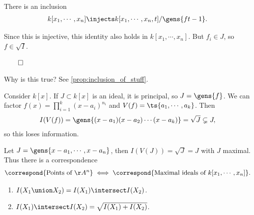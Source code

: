 \begin{proposition}[?]\label{prop:inclusion_of_stuff}

There is an inclusion
\begin{align*}  
k[x_1, \cdots, x_n] \injects
k[x_1, \cdots, x_n, t]/\gens{ft-1}
.\end{align*}

\end{proposition}

Since this is injective, this identity also holds in
\(k[x_1, \cdots, x_n]\). But \(f_i\in J\), so \(f\in \sqrt{I}\).

\(\qed\)

\begin{exercise}[?]

Why is this true? See \cref{prop:inclusion_of_stuff}.

\end{exercise}

\begin{example}

Consider \(k[x]\). If \(J\subset k[x]\) is an ideal, it is principal, so
\(J = \gens{f}\). We can factor \(f(x) = \prod_{i=1}^k (x-a_i)^{n_i}\)
and \(V(f) = \ts{a_1, \cdots, a_k}\). Then
\begin{align*}
I(V(f)) = \gens{(x-a_1)(x-a_2)\cdots(x-a_k)} = \sqrt{J} \subsetneq J
,\end{align*} so this loses information.

\end{example}

\begin{example}

Let \(J = \gens{x-a_1, \cdots, x-a_n}\), then \(I(V(J)) = \sqrt{J} = J\)
with \(J\) maximal. Thus there is a correspondence
\begin{align*}  
\correspond{\text{Points of } \AA^n} \iff 
\correspond{\text{Maximal ideals of }k[x_1, \cdots, x_n]}
.\end{align*}

\end{example}

\begin{theorem}[Properties of $I$]

\envlist

\begin{enumerate}
\def\labelenumi{\alph{enumi}.}
\item
  \(I(X_1 \union X_2) = I(X_1) \intersect I(X_2)\).
\item
  \(I(X_1) \intersect I(X_2) = \sqrt{I(X_1) + I(X_2)}\).
\end{enumerate}

\end{theorem}

